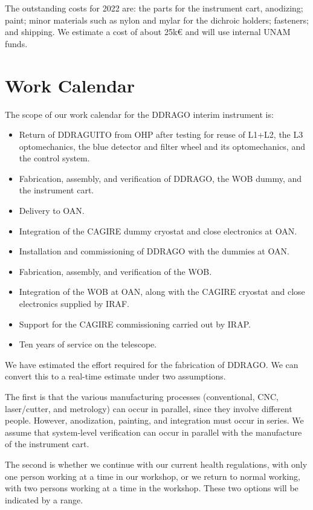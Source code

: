 \documentclass{article}
\begin{document}
The outstanding costs for 2022 are: the parts for the instrument cart, anodizing; paint; minor materials such as nylon and mylar for the dichroic holders; fasteners; and shipping. We estimate a cost of about 25k€ and will use internal UNAM funds.

\clearpage
\section{Work Calendar}

The scope of our work calendar for the DDRAGO interim instrument is:

\begin{itemize}
\item Return of DDRAGUITO from OHP after testing for reuse of L1+L2, the L3 optomechanics, the blue detector and filter wheel and its optomechanics, and the control system.
\item Fabrication, assembly, and verification of DDRAGO, the WOB dummy, and the instrument cart.
\item Delivery to OAN.
\item Integration of the CAGIRE dummy cryostat and close electronics at OAN.
\item Installation and commissioning of DDRAGO with the dummies at OAN.
\item Fabrication, assembly, and verification of the WOB.
\item Integration of the WOB at OAN, along with the CAGIRE cryostat and close electronics supplied by IRAF.
\item Support for the CAGIRE commissioning carried out by IRAP.
\item Ten years of service on the telescope.
\end{itemize}

We have estimated the effort required for the fabrication of DDRAGO. We can convert this to a real-time estimate under two assumptions. 

The first is that the various manufacturing processes (conventional, CNC, laser/cutter, and metrology) can occur in parallel, since they involve different people. However, anodization, painting, and integration must occur in series. We assume that system-level verification can occur in parallel with the manufacture of the instrument cart.

The second is whether we continue with our current health regulations, with only one person working at a time in our workshop, or we return to normal working, with two persons working at a time in the workshop. These two options will be indicated by a range.
\end{document}
